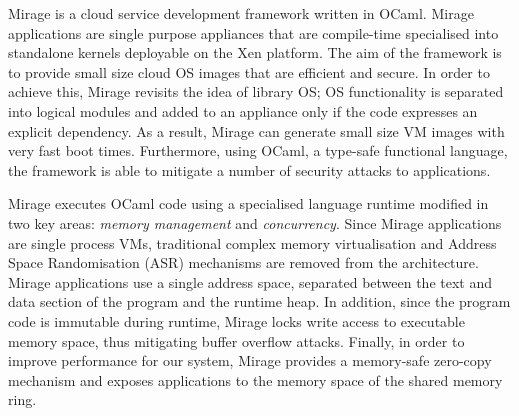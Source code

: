 

Mirage is a cloud service development framework written in OCaml. Mirage
applications are single purpose appliances that are compile-time specialised
into standalone kernels deployable on the Xen platform. The aim of the framework
is to provide small size cloud OS images that are efficient and secure.  In
order to achieve this, Mirage revisits the idea of library OS; OS functionality
is separated into logical modules and added to an appliance only if the code
expresses an explicit dependency.  As a result, Mirage can generate small size
VM images with very fast boot times.  Furthermore, using OCaml, a type-safe
functional language, the framework is able to mitigate a number of security
attacks to applications.

Mirage executes OCaml code using a specialised language runtime modified in two
key areas: \textit{memory management} and \textit{concurrency}.  Since Mirage
applications are single process VMs, traditional complex memory virtualisation
and Address Space Randomisation (ASR) mechanisms are removed from the
architecture.  Mirage applications use a single address space, separated between
the text and data section of the program and the runtime heap. In addition,
since the program code is immutable during runtime, Mirage locks write access to
executable memory space, thus mitigating buffer overflow attacks.  Finally, in
order to improve performance for our system, Mirage provides a memory-safe
zero-copy mechanism and exposes applications to the memory space of the shared
memory ring.

